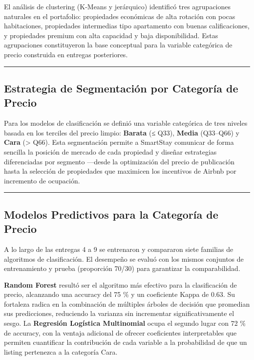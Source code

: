 \documentclass[
]{article}
\begin{document}
El análisis de clustering (K-Means y jerárquico) identificó tres
agrupaciones naturales en el portafolio: propiedades económicas de alta
rotación con pocas habitaciones, propiedades intermedias tipo
apartamento con buenas calificaciones, y propiedades premium con alta
capacidad y baja disponibilidad. Estas agrupaciones constituyeron la
base conceptual para la variable categórica de precio construida en
entregas posteriores.

\begin{center}\rule{0.5\linewidth}{0.5pt}\end{center}

\subsection{Estrategia de Segmentación por Categoría de
Precio}\label{estrategia-de-segmentaciuxf3n-por-categoruxeda-de-precio}

Para los modelos de clasificación se definió una variable categórica de
tres niveles basada en los terciles del precio limpio: \textbf{Barata}
(≤ Q33), \textbf{Media} (Q33--Q66) y \textbf{Cara} (\textgreater{} Q66).
Esta segmentación permite a SmartStay comunicar de forma sencilla la
posición de mercado de cada propiedad y diseñar estrategias
diferenciadas por segmento ---desde la optimización del precio de
publicación hasta la selección de propiedades que maximicen los
incentivos de Airbnb por incremento de ocupación.

\begin{center}\rule{0.5\linewidth}{0.5pt}\end{center}

\subsection{Modelos Predictivos para la Categoría de
Precio}\label{modelos-predictivos-para-la-categoruxeda-de-precio}

A lo largo de las entregas 4 a 9 se entrenaron y compararon siete
familias de algoritmos de clasificación. El desempeño se evaluó con los
mismos conjuntos de entrenamiento y prueba (proporción 70/30) para
garantizar la comparabilidad.

\textbf{Random Forest} resultó ser el algoritmo más efectivo para la
clasificación de precio, alcanzando una accuracy del 75 \% y un
coeficiente Kappa de 0.63. Su fortaleza radica en la combinación de
múltiples árboles de decisión que promedian sus predicciones, reduciendo
la varianza sin incrementar significativamente el sesgo. La
\textbf{Regresión Logística Multinomial} ocupa el segundo lugar con 72
\% de accuracy, con la ventaja adicional de ofrecer coeficientes
interpretables que permiten cuantificar la contribución de cada variable
a la probabilidad de que un listing pertenezca a la categoría Cara.
\end{document}
